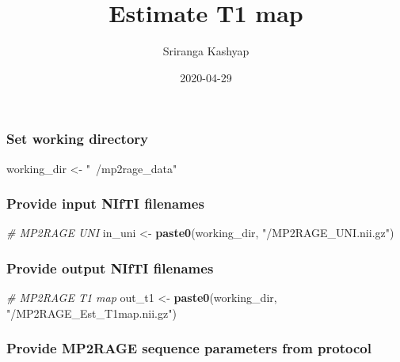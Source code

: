 \documentclass[]{article}
\title{Estimate T1 map}
\author{Sriranga Kashyap}
\date{2020-04-29}
\newenvironment{Shaded}{\begin{snugshade}}{\end{snugshade}}
\newcommand{\CommentTok}[1]{\textcolor[rgb]{0.56,0.35,0.01}{\textit{#1}}}
\newcommand{\KeywordTok}[1]{\textcolor[rgb]{0.13,0.29,0.53}{\textbf{#1}}}
\newcommand{\NormalTok}[1]{#1}
\newcommand{\StringTok}[1]{\textcolor[rgb]{0.31,0.60,0.02}{#1}}
\begin{document}
\maketitle

\hypertarget{set-working-directory}{%
\subsubsection{Set working directory}\label{set-working-directory}}

\begin{Shaded}
\begin{Highlighting}[]
\NormalTok{working_dir <-}\StringTok{ "~/mp2rage_data"}
\end{Highlighting}
\end{Shaded}

\hypertarget{provide-input-nifti-filenames}{%
\subsubsection{Provide input NIfTI
filenames}\label{provide-input-nifti-filenames}}

\begin{Shaded}
\begin{Highlighting}[]
\CommentTok{# MP2RAGE UNI}
\NormalTok{in_uni <-}\StringTok{ }\KeywordTok{paste0}\NormalTok{(working_dir, }\StringTok{"/MP2RAGE_UNI.nii.gz"}\NormalTok{)}
\end{Highlighting}
\end{Shaded}

\hypertarget{provide-output-nifti-filenames}{%
\subsubsection{Provide output NIfTI
filenames}\label{provide-output-nifti-filenames}}

\begin{Shaded}
\begin{Highlighting}[]
\CommentTok{# MP2RAGE T1 map}
\NormalTok{out_t1 <-}
\StringTok{  }\KeywordTok{paste0}\NormalTok{(working_dir, }\StringTok{"/MP2RAGE_Est_T1map.nii.gz"}\NormalTok{)}
\end{Highlighting}
\end{Shaded}

\hypertarget{provide-mp2rage-sequence-parameters-from-protocol}{%
\subsubsection{Provide MP2RAGE sequence parameters from
protocol}\label{provide-mp2rage-sequence-parameters-from-protocol}}
\end{document}

